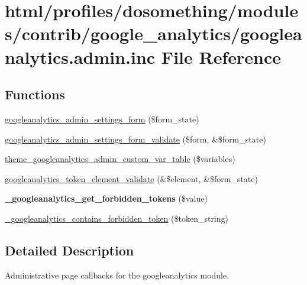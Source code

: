 \hypertarget{googleanalytics_8admin_8inc}{
\section{html/profiles/dosomething/modules/contrib/google\_\-analytics/googleanalytics.admin.inc File Reference}
\label{googleanalytics_8admin_8inc}
}
\subsection*{Functions}
\begin{DoxyCompactItemize}
\item 
\hyperlink{googleanalytics_8admin_8inc_abc6ca2b209feb9090c8ab26d6ca059c4}{googleanalytics\_\-admin\_\-settings\_\-form} (\$form\_\-state)
\item 
\hyperlink{googleanalytics_8admin_8inc_a41b564fb7aed5ae2811eddf2955eb13e}{googleanalytics\_\-admin\_\-settings\_\-form\_\-validate} (\$form, \&\$form\_\-state)
\item 
\hyperlink{googleanalytics_8admin_8inc_a5cfde94d5c2c2f7a6b3cdbce2fa21dd7}{theme\_\-googleanalytics\_\-admin\_\-custom\_\-var\_\-table} (\$variables)
\item 
\hyperlink{googleanalytics_8admin_8inc_a54d8df69a1b0518237288949dfbfdb42}{googleanalytics\_\-token\_\-element\_\-validate} (\&\$element, \&\$form\_\-state)
\item 
\hypertarget{googleanalytics_8admin_8inc_aa7288a689b8d2c092847409abd23e13d}{
{\bfseries \_\-googleanalytics\_\-get\_\-forbidden\_\-tokens} (\$value)}
\label{googleanalytics_8admin_8inc_aa7288a689b8d2c092847409abd23e13d}

\item 
\hyperlink{googleanalytics_8admin_8inc_a5b9e604bc6be58cb66a3c479aadc1481}{\_\-googleanalytics\_\-contains\_\-forbidden\_\-token} (\$token\_\-string)
\end{DoxyCompactItemize}


\subsection{Detailed Description}
Administrative page callbacks for the googleanalytics module. 


